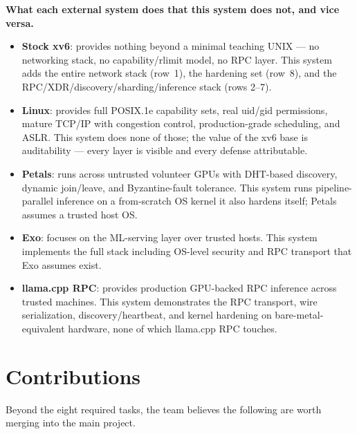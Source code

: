 \documentclass[11pt,a4paper]{article}
\begin{document}
\noindent\textbf{What each external system does that this system does not, and vice versa.}
\begin{itemize}[leftmargin=*]
\item \textbf{Stock xv6}: provides nothing beyond a minimal teaching UNIX --- no networking stack, no capability/rlimit model, no RPC layer. This system adds the entire network stack (row~1), the hardening set (row~8), and the RPC/XDR/discovery/sharding/inference stack (rows 2--7).
\item \textbf{Linux}: provides full POSIX.1e capability sets, real uid/gid permissions, mature TCP/IP with congestion control, production-grade scheduling, and ASLR. This system does none of those; the value of the xv6 base is auditability --- every layer is visible and every defense attributable.
\item \textbf{Petals}: runs across untrusted volunteer GPUs with DHT-based discovery, dynamic join/leave, and Byzantine-fault tolerance. This system runs pipeline-parallel inference on a from-scratch OS kernel it also hardens itself; Petals assumes a trusted host OS.
\item \textbf{Exo}: focuses on the ML-serving layer over trusted hosts. This system implements the full stack including OS-level security and RPC transport that Exo assumes exist.
\item \textbf{llama.cpp RPC}: provides production GPU-backed RPC inference across trusted machines. This system demonstrates the RPC transport, wire serialization, discovery/heartbeat, and kernel hardening on bare-metal-equivalent hardware, none of which llama.cpp RPC touches.
\end{itemize}

\section{Contributions}

Beyond the eight required tasks, the team believes the following are worth merging into the main project.
\end{document}
